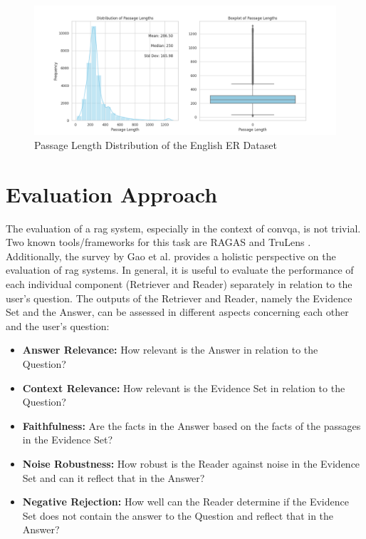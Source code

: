 \begin{figure}[H]
    \centering
    \includegraphics[width=\textwidth]{Grafiken/Statistiken/IndexEnglish_Passage_Length_Statistics.png}
    \caption{Passage Length Distribution of the English ER Dataset}
    \label{fig:er-english-passage-length}
\end{figure}


\section{Evaluation Approach}
\label{sec:metrics}

The evaluation of a \gls{rag} system, especially in the context of \gls{convqa}, is not trivial. Two known tools/frameworks for this task are RAGAS \cite{noauthor_ragas} and TruLens \cite{noauthor_truelens}. Additionally, the survey by Gao et al. \cite{gao_retrieval-augmented_2024} provides a holistic perspective on the evaluation of \gls{rag} systems. In general, it is useful to evaluate the performance of each individual component (Retriever and Reader) separately in relation to the user's question. The outputs of the Retriever and Reader, namely the Evidence Set and the Answer, can be assessed in different aspects concerning each other and the user's question:

\begin{itemize}
    \item \textbf{Answer Relevance:} How relevant is the Answer in relation to the Question?
    \item \textbf{Context Relevance:} How relevant is the Evidence Set in relation to the Question?
    \item \textbf{Faithfulness:} Are the facts in the Answer based on the facts of the passages in the Evidence Set?
    \item \textbf{Noise Robustness:} How robust is the Reader against noise in the Evidence Set and can it reflect that in the Answer?
    \item \textbf{Negative Rejection:} How well can the Reader determine if the Evidence Set does not contain the answer to the Question and reflect that in the Answer?
\end{itemize}

